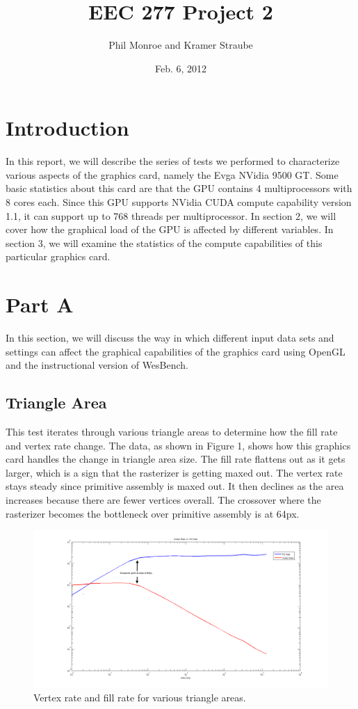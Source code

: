 \documentclass[12pt] {article}
\begin{document}
\title{EEC 277 Project 2}
\author{Phil Monroe and Kramer Straube}
\date{Feb. 6, 2012}
\maketitle

\section {Introduction}
In this report, we will describe the series of tests we performed to characterize various aspects of the graphics card, namely the Evga NVidia 9500 GT. Some basic statistics about this card are that the GPU contains 4 multiprocessors with 8 cores each. Since this GPU supports NVidia CUDA compute capability version 1.1, it can support up to 768 threads per multiprocessor. In section 2, we will cover how the graphical load of the GPU is affected by different variables. In section 3, we will examine the statistics of the compute capabilities of this particular graphics card.

\newpage
\section{Part A}
In this section, we will discuss the way in which different input data sets and settings can affect the graphical capabilities of the graphics card using OpenGL and the instructional version of WesBench.
\subsection{Triangle Area}
This test iterates through various triangle areas to determine how the fill rate and vertex rate change. The data, as shown in Figure 1, shows how this graphics card handles the change in triangle area size. The fill rate flattens out as it gets larger, which is a sign that the rasterizer is getting maxed out. The vertex rate stays steady since primitive assembly is maxed out. It then declines as the area increases because there are fewer vertices overall. The crossover where the rasterizer becomes the bottleneck over primitive assembly is at 64px.
\begin{figure}[ht!]
	\centering
	\includegraphics[width=5in]{figures/results1.png}
	\caption{Vertex rate and fill rate for various triangle areas.}
\end{figure}
\FloatBarrier
\end{document}

